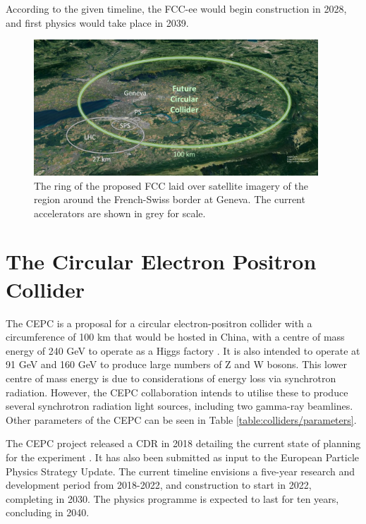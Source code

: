 According to the given timeline, the FCC-ee would begin construction in 2028, and first physics would take place in 2039. 

\begin{figure}[t]
	\centering
	\includegraphics[width=0.95\textwidth]{../Pictures/FCC-Scale.jpg}
	\caption{The ring of the proposed \acrlong{FCC} laid over satellite imagery of the region around the French-Swiss border at Geneva. The current accelerators are shown in grey for scale.}
	\label{figure:colliders/FCC/scale}
\end{figure}


\section{The Circular Electron Positron Collider}
The \acrfull{CEPC} is a proposal for a circular electron-positron collider with a circumference of 100 km that would be hosted in China, with a centre of mass energy of 240 GeV to operate as a Higgs factory \cite{cepc-cdr-accelerator}. It is also intended to operate at 91 GeV and 160 GeV to produce large numbers of Z and W bosons. This lower centre of mass energy is due to considerations of energy loss via synchrotron radiation. However, the \acrshort{CEPC} collaboration intends to utilise these to produce several synchrotron radiation light sources, including two gamma-ray beamlines. Other parameters of the \acrshort{CEPC} can be seen in Table \ref{table:colliders/parameters}.

The \acrshort{CEPC} project released a \acrfull{CDR} in 2018 detailing the current state of planning for the experiment \cite{cepc-cdr-accelerator}. It has also been submitted as input to the European Particle Physics Strategy Update. The current timeline envisions a five-year research and development period from 2018-2022, and construction to start in 2022, completing in 2030. The physics programme is expected to last for ten years, concluding in 2040. 

